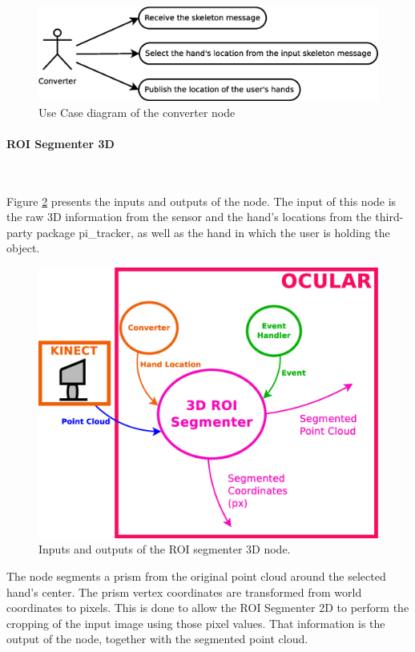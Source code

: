 	\begin{figure}[H]
		\centering
		\includegraphics[scale=0.4]{img/diagrams/uc_converter.eps}
		\caption[Use case diagram converter node]{Use Case diagram of the converter node}
		\label{uc_converter}
	\end{figure}

	

\paragraph{ROI Segmenter 3D}\mbox{}\\
	\label{roi_segmenter_3d}

	Figure  \ref{node_roi3d} presents the inputs and outputs of the node. 
	The input of this node is the raw 3D information from the sensor and the hand's locations from the third-party package pi\_tracker, as well as the hand in which the user is holding the object. 

		\begin{figure}[H]
			\begin{center}
			\includegraphics[width=0.5\linewidth]{img/diagrams/node_roi3d.eps}
			\caption[ROI segmenter 3D node I/O]{Inputs and outputs of the ROI segmenter 3D node.}		
			\label{node_roi3d}
			\end{center}
		\end{figure}


	The node segments a prism from the original point cloud around the selected hand's center. 
	The prism vertex coordinates are transformed from world coordinates to pixels. 
	This is done to allow the ROI Segmenter 2D to perform the cropping of the input image using those pixel values. 
	That information is the output of the node, together with the segmented point cloud. 

